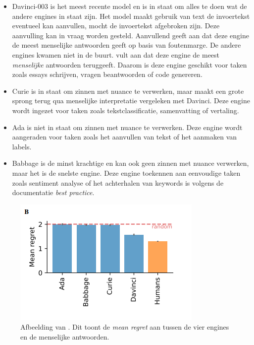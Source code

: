 \begin{itemize}
	\item Davinci-003 is het meest recente model en is in staat om alles te doen wat de andere engines in staat zijn. Het model maakt gebruik van text de invoertekst eventueel kan aanvullen, mocht de invoertekst afgebroken zijn. Deze aanvulling kan in vraag worden gesteld. Aanvullend geeft aan dat deze engine de meest menselijke antwoorden geeft op basis van foutenmarge. De andere engines kwamen niet in de buurt. \textcite{Binz2023} vult aan dat deze engine de meest \textit{menselijke} antwoorden teruggeeft. Daarom is deze engine geschikt voor taken zoals essays schrijven, vragen beantwoorden of code genereren.
	\item Curie is in staat om zinnen met nuance te verwerken, maar maakt een grote sprong terug qua menselijke interpretatie vergeleken met Davinci. Deze engine wordt ingezet voor taken zoals tekstclassificatie, samenvatting of vertaling.
	\item Ada is niet in staat om zinnen met nuance te verwerken. Deze engine wordt aangeraden voor taken zoals het aanvullen van tekst of het aanmaken van labels.
	\item Babbage is de minst krachtige en kan ook geen zinnen met nuance verwerken, maar het is de snelste engine. Deze engine toekennen aan eenvoudige taken zoals sentiment analyse of het achterhalen van keywords is volgens de documentatie \textit{best practice}.
\end{itemize} 

\begin{figure}
	\begin{center}
		\includegraphics{img/chatgpt-engines-mean-regret.png}
		\caption{Afbeelding van \textcite{Binz2023}. Dit toont de \textit{mean regret} aan tussen de vier engines en de menselijke antwoorden.}
	\end{center}
\end{figure}

